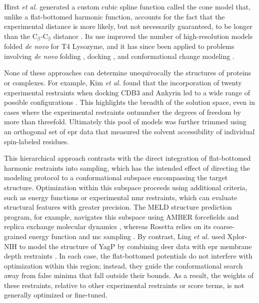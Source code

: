 Hirst \emph{et al.} generated a custom cubic spline function called the \gls{cone} model that, unlike a flat-bottomed harmonic function, accounts for the fact that the experimental distance is more likely, but not necessarily guaranteed, to be longer than the $\mathrm{C_{\upbeta}}$-$\mathrm{C_{\upbeta}}$ distance \citep*{Hirst2011}. Its use improved the number of high-resolution models folded \emph{de novo} for T4 Lysozyme, and it has since been applied to problems involving \emph{de novo} folding \citep*{Fischer2015, Fischer2017, Fischer2016}, docking \citep*{Alexander2014, Dastvan2016, Fischer2016, Tessmer2018}, and conformational change modeling \citep*{Dastvan2016, Kim2012, Krug2016, VanEps2011}.

None of these approaches can determine unequivocally the structures of proteins or complexes. For example, Kim \emph{et al.} found that the incorporation of twenty experimental restraints when docking CDB3 and Ankyrin led to a wide range of possible configurations \citep*{Kim2011}. This highlights the breadth of the solution space, even in cases where the experimental restraints outnumber the degrees of freedom by more than threefold. Ultimately this pool of models was further trimmed using an orthogonal set of \gls{epr} data that measured the solvent accessibility of individual spin-labeled residues.

This hierarchical approach contrasts with the direct integration of flat-bottomed harmonic restraints into sampling, which has the intended effect of directing the modeling protocol to a conformational subspace encompassing the target structure. Optimization within this subspace proceeds using additional criteria, such as energy functions or experimental \gls{nmr} restraints, which can evaluate structural features with greater precision. The MELD structure prediction program, for example, navigates this subspace using AMBER forcefields and replica exchange molecular dynamics \citep*{MacCallum2015, Perez2016}, whereas Rosetta relies on its coarse-grained energy function and \gls{mc} sampling \citep*{Alexander2008, Kazmier2011}. By contrast, Ling \emph{et al.} used Xplor-NIH to model the structure of YagP by combining \gls{deer} data with \gls{epr} membrane depth restraints \citep*{Ling2016}. In each case, the flat-bottomed potentials do not interfere with optimization within this region; instead, they guide the conformational search away from false minima that fall outside their bounds. As a result, the weights of these restraints, relative to other experimental restraints or score terms, is not generally optimized or fine-tuned. 

